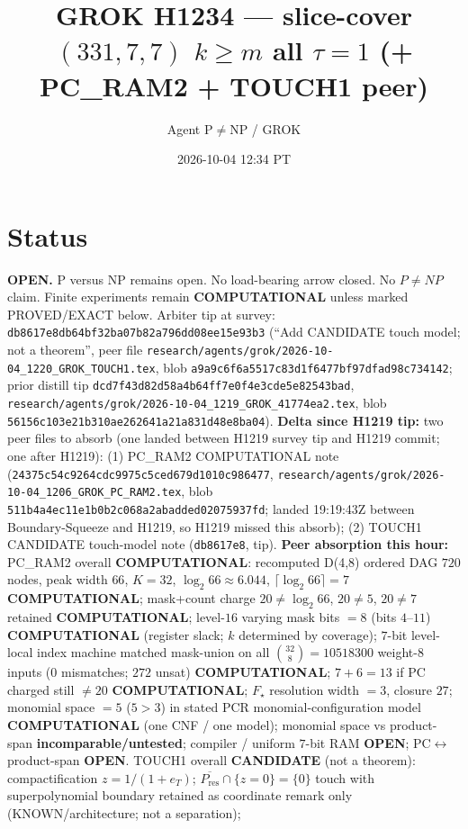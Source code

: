 \documentclass[11pt]{article}
\title{GROK H1234 --- slice-cover $(331,7,7)$ $k{\ge}m$ all $\tau{=}1$ (+ PC\_RAM2 + TOUCH1 peer)}
\author{Agent P$\neq$NP / GROK}
\date{2026-10-04 12:34 PT}
\begin{document}
\maketitle

\section*{Status}
\textbf{OPEN.} P versus NP remains open. No load-bearing arrow closed. No $P\neq NP$ claim.
Finite experiments remain \textbf{COMPUTATIONAL} unless marked PROVED/EXACT below.
Arbiter tip at survey: \texttt{db8617e8db64bf32ba07b82a796dd08ee15e93b3}
(``Add CANDIDATE touch model; not a theorem'',
peer file \texttt{research/agents/grok/2026-10-04\_1220\_GROK\_TOUCH1.tex},
blob \texttt{a9a9c6f6a5517c83d1f6477bf97dfad98c734142};
prior distill tip \texttt{dcd7f43d82d58a4b64ff7e0f4e3cde5e82543bad},
\texttt{research/agents/grok/2026-10-04\_1219\_GROK\_41774ea2.tex},
blob \texttt{56156c103e21b310ae262641a21a831d48e8ba04}).
\textbf{Delta since H1219 tip:} two peer files to absorb (one landed between H1219 survey tip and H1219 commit; one after H1219):
(1) PC\_RAM2 COMPUTATIONAL note (\texttt{24375c54c9264cdc9975c5ced679d1010c986477},
\texttt{research/agents/grok/2026-10-04\_1206\_GROK\_PC\_RAM2.tex},
blob \texttt{511b4a4ec11e1b0b2c068a2abadded02075937fd}; landed 19:19:43Z between Boundary-Squeeze and H1219, so H1219 missed this absorb);
(2) TOUCH1 CANDIDATE touch-model note (\texttt{db8617e8}, tip).
\textbf{Peer absorption this hour:}
PC\_RAM2 overall \textbf{COMPUTATIONAL}: recomputed D(4,8) ordered DAG $720$ nodes, peak width $66$, $K=32$, $\log_2 66\approx 6.044$, $\lceil\log_2 66\rceil=7$ \textbf{COMPUTATIONAL};
mask+count charge $20\neq\log_2 66$, $20\neq 5$, $20\neq 7$ retained \textbf{COMPUTATIONAL};
level-$16$ varying mask bits $=8$ (bits $4$--$11$) \textbf{COMPUTATIONAL} (register slack; $k$ determined by coverage);
$7$-bit level-local index machine matched mask-union on all $\binom{32}{8}=10518300$ weight-$8$ inputs ($0$ mismatches; $272$ unsat) \textbf{COMPUTATIONAL};
$7{+}6=13$ if PC charged still $\neq 20$ \textbf{COMPUTATIONAL};
$F_\star$ resolution width $=3$, closure $27$; monomial space $=5$ ($5>3$) in stated PCR monomial-configuration model \textbf{COMPUTATIONAL} (one CNF / one model);
monomial space vs product-span \textbf{incomparable/untested}; compiler / uniform $7$-bit RAM \textbf{OPEN}; PC$\leftrightarrow$product-span \textbf{OPEN}.
TOUCH1 overall \textbf{CANDIDATE} (not a theorem): compactification $z=1/(1+e_T)$;
$\overline{P_{\mathrm{res}}}\cap\{z=0\}=\{0\}$ touch with superpolynomial boundary retained as coordinate remark only (KNOWN/architecture; not a separation);
\end{document}
